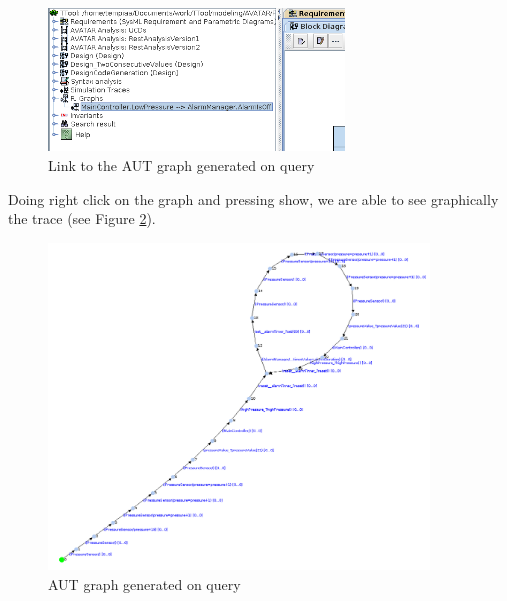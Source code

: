 \documentclass[12pt]{article}
\begin{document}
\begin{figure}[h!]
\centering
\includegraphics[width=0.7\textwidth]{images/AUTgraphlist.png}
\caption{Link to the AUT graph generated on query}
\label{fig:aut}
\end{figure}
Doing right click on the graph and pressing show, we are able to see graphically the trace (see Figure \ref{fig:trgraph}).
\begin{figure}[h!]
\centering
\includegraphics[width=0.9\textwidth]{images/counterexamplegraph.png}
\caption{AUT graph generated on query}
\label{fig:trgraph}
\end{figure}
\end{document}
